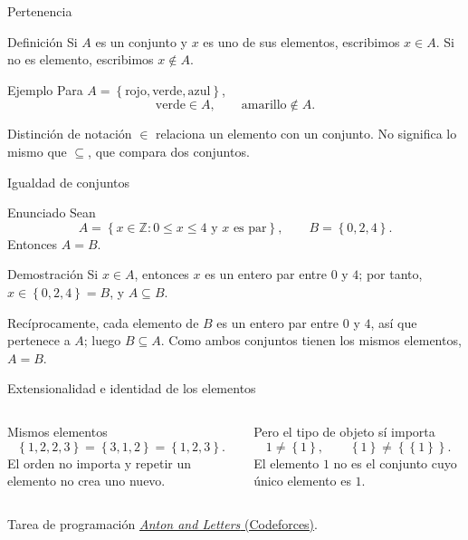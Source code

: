 \documentclass[aspectratio=169,11pt]{beamer}
\newcommand{\ZZ}{\mathbb{Z}}
\newcommand{\Set}[1]{\left\{#1\right\}}
\begin{document}
\begin{frame}{Pertenencia}
    \begin{block}{Definición}
        Si $A$ es un conjunto y $x$ es uno de sus elementos, escribimos $x\in A$. Si no es elemento, escribimos $x\notin A$.
    \end{block}
    \begin{exampleblock}{Ejemplo}
        Para $A=\Set{\text{rojo},\text{verde},\text{azul}}$,
        \[
          \text{verde}\in A,\qquad \text{amarillo}\notin A.
        \]
    \end{exampleblock}
    \begin{alertblock}{Distinción de notación}
        $\in$ relaciona un elemento con un conjunto. No significa lo mismo que $\subseteq$, que compara dos conjuntos.
    \end{alertblock}
\end{frame}

\begin{frame}{Igualdad de conjuntos}
    \begin{block}{Enunciado}
        Sean
        \[
          A=\Set{x\in\ZZ:0\leq x\leq4\text{ y }x\text{ es par}},
          \qquad B=\Set{0,2,4}.
        \]
        Entonces $A=B$.
    \end{block}
    \begin{block}{Demostración}
        Si $x\in A$, entonces $x$ es un entero par entre $0$ y $4$; por tanto, $x\in\Set{0,2,4}=B$, y $A\subseteq B$.

        Recíprocamente, cada elemento de $B$ es un entero par entre $0$ y $4$, así que pertenece a $A$; luego $B\subseteq A$. Como ambos conjuntos tienen los mismos elementos, $A=B$.
    \end{block}
\end{frame}


\begin{frame}{Extensionalidad e identidad de los elementos}
    \begin{columns}[T,onlytextwidth]
        \begin{exampleblock}{Mismos elementos}
            \[
            \Set{1,2,2,3}=\Set{3,1,2}=\Set{1,2,3}.
            \]
            El orden no importa y repetir un elemento no crea uno nuevo.
        \end{exampleblock}
        \begin{alertblock}{Pero el tipo de objeto sí importa}
            \[
            1\ne\Set{1},\qquad \Set{1}\ne\Set{\Set{1}}.
            \]
            El elemento $1$ no es el conjunto cuyo único elemento es $1$.
        \end{alertblock}
    \end{columns}
    \begin{exampleblock}{Tarea de programación}
        \href{https://codeforces.com/problemset/problem/443/A}{\textit{Anton and Letters} (Codeforces)}.
    \end{exampleblock}
\end{frame}
\end{document}
